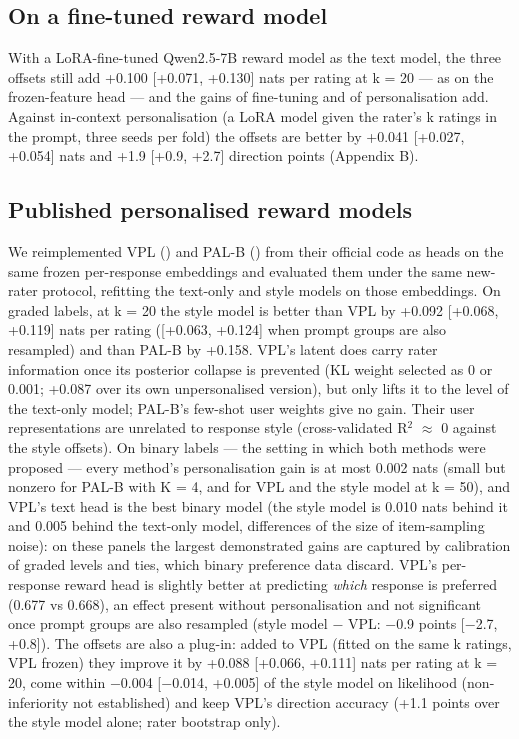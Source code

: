\documentclass{article}
\begin{document}
\subsection{On a fine-tuned reward model}

With a LoRA-fine-tuned Qwen2.5-7B reward model as the text model, the three offsets still add +0.100 {[}+0.071, +0.130{]} nats per rating at k = 20 --- as on the frozen-feature head --- and the gains of fine-tuning and of personalisation add. Against in-context personalisation (a LoRA model given the rater's k ratings in the prompt, three seeds per fold) the offsets are better by +0.041 {[}+0.027, +0.054{]} nats and +1.9 {[}+0.9, +2.7{]} direction points (Appendix B).

\subsection{Published personalised reward models}

We reimplemented VPL (\citealp{poddar2024vpl}) and PAL-B (\citealp{chen2025pal}) from their official code as heads on the same frozen per-response embeddings and evaluated them under the same new-rater protocol, refitting the text-only and style models on those embeddings. On graded labels, at k = 20 the style model is better than VPL by +0.092 {[}+0.068, +0.119{]} nats per rating ({[}+0.063, +0.124{]} when prompt groups are also resampled) and than PAL-B by +0.158. VPL's latent does carry rater information once its posterior collapse is prevented (KL weight selected as 0 or 0.001; +0.087 over its own unpersonalised version), but only lifts it to the level of the text-only model; PAL-B's few-shot user weights give no gain. Their user representations are unrelated to response style (cross-validated R$^2$ $\approx$ 0 against the style offsets). On binary labels --- the setting in which both methods were proposed --- every method's personalisation gain is at most 0.002 nats (small but nonzero for PAL-B with K = 4, and for VPL and the style model at k = 50), and VPL's text head is the best binary model (the style model is 0.010 nats behind it and 0.005 behind the text-only model, differences of the size of item-sampling noise): on these panels the largest demonstrated gains are captured by calibration of graded levels and ties, which binary preference data discard. VPL's per-response reward head is slightly better at predicting \emph{which} response is preferred (0.677 vs 0.668), an effect present without personalisation and not significant once prompt groups are also resampled (style model $-$ VPL: $-$0.9 points {[}$-$2.7, +0.8{]}). The offsets are also a plug-in: added to VPL (fitted on the same k ratings, VPL frozen) they improve it by +0.088 {[}+0.066, +0.111{]} nats per rating at k = 20, come within $-$0.004 {[}$-$0.014, +0.005{]} of the style model on likelihood (non-inferiority not established) and keep VPL's direction accuracy (+1.1 points over the style model alone; rater bootstrap only).
\end{document}
